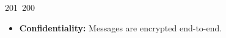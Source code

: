 201~200~\documentclass{article}
\begin{document}
	                                                                                                                                                                                                                                                                                                	                                                                                                                                        	    	                                                                                                	                                                                                                                                                                                                                                                                                                                                	                                                                        	                                                                        	                                                                                                                                        	                                                                                                                                                                                                                        	                                                    \begin{itemize}
	                                                                                                                                                                                                                                                                                                	                                                                                                                                        	    	                                                                                                	                                                                                                                                                                                                                                                                                                                                	                                                                        	                                                                        	                                                                                                                                        	                                                                                                                                                                                                                        	                                                        \item \textbf{Confidentiality:} Messages are encrypted end-to-end.

\end{itemize}
\end{document}
